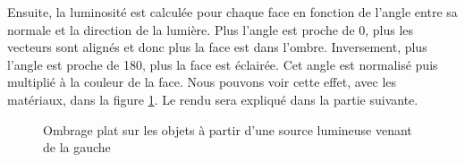         Ensuite, la luminosité est calculée pour chaque face en fonction de l'angle entre sa normale et la direction de la lumière. Plus l'angle est proche de 0\degree, plus les vecteurs sont alignés et donc plus la face est dans l'ombre. Inversement, plus l'angle est proche de 180\degree, plus la face est éclairée. Cet angle est normalisé puis multiplié à la couleur de la face. Nous pouvons voir cette effet, avec les matériaux, dans la figure \ref{fig:lumiere}. Le rendu sera expliqué dans la partie suivante.

        \begin{figure}[h]
            \centering

            \hspace{.005\textwidth}

            \caption{Ombrage plat sur les objets à partir d'une source lumineuse venant de la gauche}
            \label{fig:lumiere}
        \end{figure}

